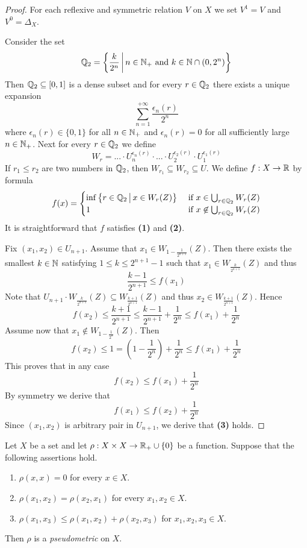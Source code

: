 \documentclass[10pt]{amsart}
\begin{document}
\begin{proof}
	For each reflexive and symmetric relation $V$ on $X$ we set $V^{1} = V$ and $V^0 = \Delta_X$.

	Consider the set
	$${\mathbb Q}_2 = \bigg\{\frac{k}{2^n}\,\bigg|\,n\in {\mathbb N}_+\mbox{ and }k\in {\mathbb N}\cap (0,2^{n}) \bigg\}$$
	Then ${\mathbb Q}_2 \subseteq [0,1]$ is a dense subset and for every $r \in {\mathbb Q}_2$ there exists a unique expansion
	$$\sum_{n=1}^{+\infty}\frac{\epsilon_n(r)}{2^n}$$
	where $\epsilon_n(r) \in \{0,1\}$ for all $n\in {\mathbb N}_+$ and $\epsilon_n(r) = 0$ for all sufficiently large $n \in {\mathbb N}_+$. Next for every $r \in {\mathbb Q}_2$ we define
	$$W_r = ... \cdot U_n^{\epsilon_n(r)}\cdot ...\cdot U_2^{\epsilon_2(r)}\cdot U_1^{\epsilon_1(r)}$$
	If $r_1 \leq r_2$ are two numbers in ${\mathbb Q}_2$, then $W_{r_1}\subseteq W_{r_2} \subseteq U$. We define $f:X\rightarrow {\mathbb R}$ by formula
	$$f(x) = \begin{cases}
		\inf \big\{r\in {\mathbb Q}_2\,\big|\,x\in W_r(Z)\big\} & \mbox{ if }x \in \bigcup_{r\in {\mathbb Q}_2} W_r(Z)      \\
		1                                               & \mbox{ if }x\not \in \bigcup_{r\in {\mathbb Q}_2} W_r(Z) \\
		\end{cases}
	$$
	It is straightforward that $f$ satisfies \textbf{(1)} and \textbf{(2)}.

	Fix $(x_1,x_2) \in U_{n+1}$. Assume that $x_1 \in W_{1 - \frac{1}{2^{n+1}}}(Z)$. Then there exists the smallest $k \in {\mathbb N}$ satisfying $1 \leq k \leq 2^{n+1} - 1$ such that $x_1 \in W_{\frac{k}{2^{n+1}}}(Z)$ and thus
	$$\frac{k - 1}{2^{n+1}} \leq f(x_1)$$
	Note that $U_{n+1}\cdot W_{\frac{k}{2^{n+1}}}(Z) \subseteq W_{\frac{k + 1}{2^{n+1}}}(Z)$ and thus $x_2 \in W_{\frac{k + 1}{2^{n + 1}}}(Z)$. Hence
	$$f(x_2) \leq \frac{k + 1}{2^{n+1}} \leq \frac{k - 1}{2^{n+1}} + \frac{1}{2^{n}}\leq f(x_1) + \frac{1}{2^n}$$
	Assume now that $x_1 \not \in W_{1 - \frac{1}{2^n}}(Z)$. Then
	$$f(x_2) \leq 1 = \left(1 - \frac{1}{2^n}\right) + \frac{1}{2^{n}} \leq f(x_1) + \frac{1}{2^n}$$
	This proves that in any case
	$$f(x_2) \leq f(x_1) + \frac{1}{2^n}$$
	By symmetry we derive that
	$$f(x_1) \leq f(x_2) + \frac{1}{2^n}$$
	Since $(x_1, x_2)$ is arbitrary pair in $U_{n + 1}$, we derive that \textbf{(3)} holds.
\end{proof}

\begin{definition}
	Let $X$ be a set and let $\rho:X\times X \rightarrow {\mathbb R}_+\cup \{0\}$ be a function. Suppose that the following assertions hold.
	\begin{enumerate}[label=\textbf{(\arabic*)}, leftmargin=3.0em]
		\item $\rho(x, x) = 0$ for every $x \in X$.
		\item $\rho(x_1, x_2) = \rho(x_2, x_1)$ for every $x_1,x_2 \in X$.
		\item $\rho(x_1, x_3) \leq \rho(x_1, x_2) + \rho(x_2, x_3)$ for $x_1,x_2,x_3 \in X$.
	\end{enumerate}
	Then $\rho$ is a \textit{pseudometric} on $X$.
\end{definition}
\end{document}
